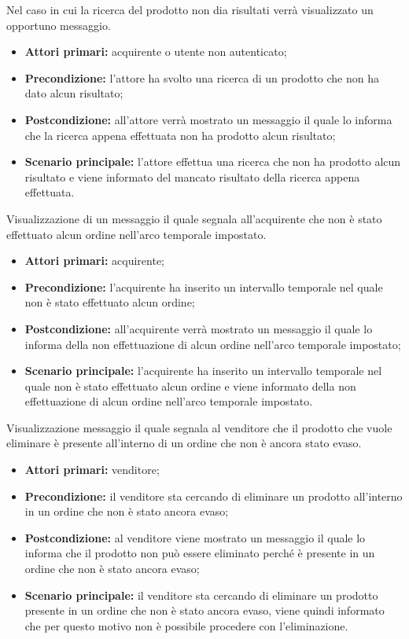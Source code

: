 
Nel caso in cui la ricerca del prodotto non dia risultati verrà visualizzato un opportuno messaggio.
\begin{itemize}
	\item \textbf{Attori primari:} acquirente o utente non autenticato;
	\item \textbf{Precondizione:} l'attore ha svolto una ricerca di un prodotto che non ha dato alcun risultato;
	\item \textbf{Postcondizione:} all'attore verrà mostrato un messaggio il quale lo informa che la ricerca appena effettuata non ha prodotto alcun risultato;
	\item \textbf{Scenario principale:} l'attore effettua una ricerca che non ha prodotto alcun risultato e viene informato del mancato risultato della ricerca appena effettuata.
\end{itemize}

Visualizzazione di un messaggio il quale segnala all'acquirente che non è stato effettuato alcun ordine nell'arco temporale impostato.
\begin{itemize}
    \item \textbf{Attori primari:} acquirente;
    \item \textbf{Precondizione:} l'acquirente ha inserito un intervallo temporale nel quale non è stato effettuato alcun ordine;
    \item \textbf{Postcondizione:} all'acquirente verrà mostrato un messaggio il quale lo informa della non effettuazione di alcun ordine nell'arco temporale impostato;
    \item \textbf{Scenario principale:} l'acquirente ha inserito un intervallo temporale nel quale non è stato effettuato alcun ordine e viene informato della non effettuazione di alcun ordine nell'arco temporale impostato.
\end{itemize}

Visualizzazione messaggio il quale segnala al venditore che il prodotto che vuole eliminare è presente all'interno di un ordine che non è ancora stato evaso.
\begin{itemize}
    \item \textbf{Attori primari:} venditore;
    \item \textbf{Precondizione:} il venditore sta cercando di eliminare un prodotto all'interno in un ordine che non è stato ancora evaso;
    \item \textbf{Postcondizione:} al venditore viene mostrato un messaggio il quale lo informa che il prodotto non può essere eliminato perché è presente in un ordine che non è stato ancora evaso;
    \item \textbf{Scenario principale:} il venditore sta cercando di eliminare un prodotto presente in un ordine che non è stato ancora evaso, viene quindi informato che per questo motivo non è possibile procedere con l'eliminazione.
\end{itemize}

